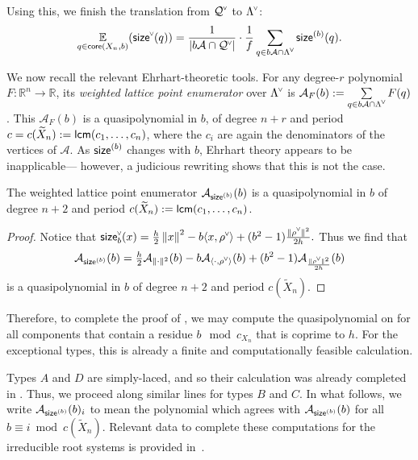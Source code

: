 \documentclass[ALCO,published]{cedram}
\newcommand{\darkblue}{\color{darkblue}} %
\newcommand{\defn}[1]{\emph{\darkblue #1}}
\newcommand{\chk}[1]{#1^{\normalfont\smash{\scalebox{.5}[.5]{\rotatebox{90}{\textbf{\textless}}}}}}
\newcommand{\R}{\mathbb{R}}
\newcommand{\lcm}{{\sf lcm}}
\newcommand{\Expt}[2]{\operatorname*{\mathbb{E}}\limits_{#1}(#2)}
\newcommand{\Q}{\mathcal{Q}}
\newcommand{\ac}{\mathcal{A}}
\newcommand{\core}{{\sf core}}
\newcommand{\cwl}{\chk{\Lambda}}
\newcommand{\size}{{\sf size}}
\newcommand{\sizeb}{\size^{(b)}}
\begin{document}
Using this, we finish the translation from $\chk{\Q}$ to $\cwl$:
\begin{equation}
\label{eq:ev_coweight_sum}
\Expt{q \in \core(X_n,b)}{\chk{\size}(q)} = \frac{1}{|b\ac\cap\chk{\Q}|}\cdot \frac{1}{f}\sum_{q\in b\ac\cap\cwl} \sizeb(q).    
\end{equation}

We now recall the relevant Ehrhart-theoretic tools. For any degree-$r$ polynomial $F:\R^n\to\R$, its \defn{weighted lattice point enumerator} over $\cwl$ is
$ \ac_F(b) := \sum\limits_{q\in b\ac\cap\cwl} F(q)$. This $\ac_F(b)$ is a quasipolynomial in $b$, of degree $n+r$ and period $c=c(\widetilde{X}_n):=\lcm(c_1,\dots,c_n)$, where the $c_i$ are again the denominators of the vertices of $\ac$. As $\size^{(b)}$ changes with $b$, Ehrhart theory appears to be inapplicable--- however, a judicious rewriting shows that this is not the case.

\begin{prop}
	The weighted lattice point enumerator $\ac_{\sizeb}(b)$
    is a quasipolynomial in $b$ of degree $n+2$ and period $c(\widetilde{X}_n):=\lcm(c_1,\ldots,c_n)$.
\label{prop:quasipoly}
\end{prop}

\begin{proof}
    Notice that $\chk{\size}_b(x)=\frac{h}{2}\left\|x\right\|^2-b\langle x,\chk{\rho}\rangle+(b^2-1)\frac{\left\|\chk{\rho}\right\|^2}{2h}.$
   Thus we find that
   \[\ac_{\sizeb}(b)={\textstyle\frac{h}{2}}\ac_{\|\cdot\|^2}(b)-b\ac_{\langle\cdot,\chk{\rho}\rangle}(b)+(b^2-1)\ac_{\frac{\left\|\chk{\rho}\right\|^2}{2h}}(b)\]
   is a quasipolynomial in $b$ of degree $n+2$ and period $c(\widetilde{X}_n)$.
\end{proof}

Therefore, to complete the proof of , we may compute the quasipolynomial on for all components that contain a residue $b\mod c_{X_n}$ that is coprime to $h$. For the exceptional types, this is already a finite and computationally feasible calculation. 

Types $A$ and $D$ are simply-laced, and so their calculation was already completed in \cite{thiel2017strange}. Thus, we proceed along similar lines for types $B$ and $C$. In what follows, we write $\ac_{\sizeb}(b)_i$ to mean the polynomial which agrees with $\ac_{\sizeb}(b)$ for all $b\equiv i\bmod c(\widetilde{X}_n)$.  Relevant data to complete these computations for the irreducible root systems is provided in~.
\end{document}
